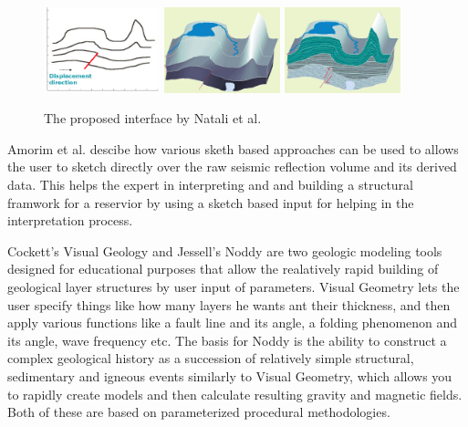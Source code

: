 \documentclass[a4paper,12pt]{report}
\begin{document}
\begin{figure}
 
 \centering
    \includegraphics[width=0.3\textwidth]{thesis/related/natali1.png}
    \includegraphics[width=0.3\textwidth]{thesis/related/natali2.png}
    \includegraphics[width=0.3\textwidth]{thesis/related/natali3.png}
  \caption{The proposed interface by Natali et al. }
  \label{fig:nataliRapid}
\end{figure}

Amorim et al. \cite{amorim2012sketch} descibe how various sketh based approaches can be used to allows the user to sketch directly over the raw seismic reflection volume and its derived data. This helps the expert in interpreting and and building a structural framwork for a reservior by using a sketch based input for helping in the interpretation process.

Cockett's Visual Geology \cite{Cockett:Online} and Jessell's Noddy \cite{jessell1981noddy} are two geologic modeling tools designed for educational purposes that allow the realatively rapid building of geological layer structures by user input of parameters. Visual Geometry lets the user specify things like how many layers he wants ant their thickness, and then apply various functions like a fault line and its angle, a folding phenomenon and its angle, wave frequency etc. The basis for Noddy is the ability to construct a complex geological history as a succession of relatively simple structural, sedimentary and igneous events similarly to Visual Geometry, which allows you to rapidly create models and then calculate resulting gravity and magnetic fields. Both of these are based on parameterized procedural methodologies.
\end{document}
